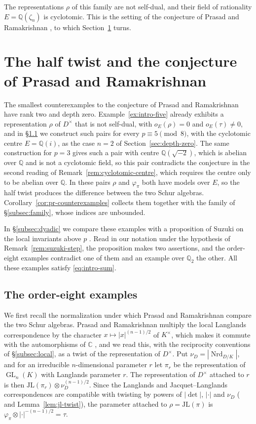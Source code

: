 \documentclass[a4paper,11pt]{amsart}
\theoremstyle{definition}
\theoremstyle{remark}
\numberwithin{equation}{section}
\newcommand{\Q}{\mathbb{Q}}
\DeclareMathOperator{\GL}{GL}
\newcommand{\C}{\mathbb{C}}
\newcommand{\JL}{\mathrm{JL}}
\DeclareMathOperator{\Nrd}{Nrd}
\begin{document}
The representations $\rho$ of this family are not self-dual, and their field of rationality $E=\Q(\zeta_n)$ is cyclotomic. This is the setting of the conjecture of Prasad and Ramakrishnan \cite[Conjecture~6.1(1)]{PR12}, to which Section~\ref{sec:counterexamples} turns.

\section{The half twist and the conjecture of Prasad and Ramakrishnan}\label{sec:counterexamples}

The smallest counterexamples to the conjecture of Prasad and Ramakrishnan have rank two and depth zero. Example~\ref{ex:intro-five} already exhibits a representation $\rho$ of $D^\times$ that is not self-dual, with $o_E(\rho)=0$ and $o_E(\tau)\neq0$, and in \S\ref{subsec:order-eight} we construct such pairs for every $p\equiv5\pmod8$, with the cyclotomic centre $E=\Q(i)$, as the case $n=2$ of Section~\ref{sec:depth-zero}. The same construction for $p=3$ gives such a pair with centre $\Q(\sqrt{-2})$, which is abelian over $\Q$ and is not a cyclotomic field, so this pair contradicts the conjecture in the second reading of Remark~\ref{rem:cyclotomic-centre}, which requires the centre only to be abelian over $\Q$. In these pairs $\rho$ and $\varphi_\pi$ both have models over $E$, so the half twist produces the difference between the two Schur algebras. Corollary~\ref{cor:pr-counterexamples} collects them together with the family of \S\ref{subsec:family}, whose indices are unbounded.

In \S\ref{subsec:dyadic} we compare these examples with a proposition of Suzuki on the local invariants above $p$ \cite[Proposition~4.0.13]{Su23}. Read in our notation under the hypothesis of Remark~\ref{rem:suzuki-step}, the proposition makes two assertions, and the order-eight examples contradict one of them and an example over $\Q_2$ the other. All these examples satisfy \eqref{eq:intro-sum}.

\subsection{The order-eight examples}\label{subsec:order-eight}

We first recall the normalization under which Prasad and Ramakrishnan compare the two Schur algebras. Prasad and Ramakrishnan multiply the local Langlands correspondence by the character $x\mapsto|x|^{(n-1)/2}$ of $K^\times$, which makes it commute with the automorphisms of $\C$ \cite[\S6]{PR12}, and we read this, with the reciprocity conventions of \S\ref{subsec:local}, as a twist of the representation of $D^\times$. Put $\nu_D=|\Nrd_{D/K}|$, and for an irreducible $n$-dimensional parameter $r$ let $\pi_r$ be the representation of $\GL_n(K)$ with Langlands parameter $r$. The representation of $D^\times$ attached to $r$ is then $\JL(\pi_r)\otimes\nu_D^{(n-1)/2}$. Since the Langlands and Jacquet--Langlands correspondences are compatible with twisting by powers of $|\det|$, $|\cdot|$ and $\nu_D$ (\cite[\S2.2.1]{Dat07} and Lemma~\ref{lem:jl-twist}), the parameter attached to $\rho=\JL(\pi)$ is $\varphi_\pi\otimes|\cdot|^{-(n-1)/2}=\tau$.
\end{document}
